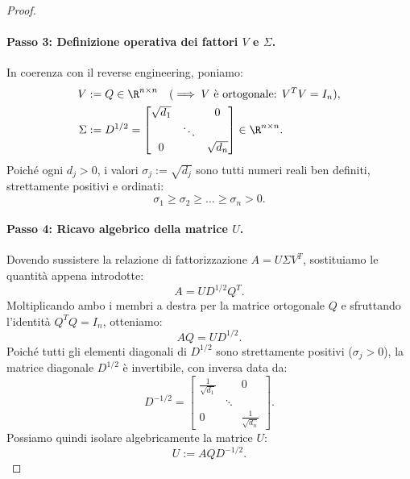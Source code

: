 \begin{proof}
\paragraph{Passo 3: Definizione operativa dei fattori $V$ e $\Sigma$.}
In coerenza con il reverse engineering, poniamo:
\begin{align}
    V &:= Q \in \R^{n \times n} \quad (\implies V \text{ \`e ortogonale: } V^T V = I_n), \\
    \Sigma &:= D^{1/2} = \begin{bmatrix}
        \sqrt{d_1} & & 0 \\
        & \ddots & \\
        0 & & \sqrt{d_n}
    \end{bmatrix} \in \R^{n \times n}.
\end{align}
Poich\'e ogni $d_j > 0$, i valori $\sigma_j := \sqrt{d_j}$ sono tutti numeri reali ben definiti, strettamente positivi e ordinati:
\begin{equation}
    \sigma_1 \ge \sigma_2 \ge \dots \ge \sigma_n > 0.
\end{equation}

\paragraph{Passo 4: Ricavo algebrico della matrice $U$.}
Dovendo sussistere la relazione di fattorizzazione $A = U \Sigma V^T$, sostituiamo le quantit\`a appena introdotte:
\begin{equation}
    A = U D^{1/2} Q^T.
\end{equation}
Moltiplicando ambo i membri a destra per la matrice ortogonale $Q$ e sfruttando l'identit\`a $Q^T Q = I_n$, otteniamo:
\begin{equation}
    A Q = U D^{1/2}.
\end{equation}
Poich\'e tutti gli elementi diagonali di $D^{1/2}$ sono strettamente positivi ($\sigma_j > 0$), la matrice diagonale $D^{1/2}$ \`e invertibile, con inversa data da:
\begin{equation}
    D^{-1/2} = \begin{bmatrix}
        \frac{1}{\sqrt{d_1}} & & 0 \\
        & \ddots & \\
        0 & & \frac{1}{\sqrt{d_n}}
    \end{bmatrix}.
\end{equation}
Possiamo quindi isolare algebricamente la matrice $U$:
\begin{equation}
\label{eq:svd-costruzione-U}
    U := A Q D^{-1/2}.
\end{equation}


\end{proof}
